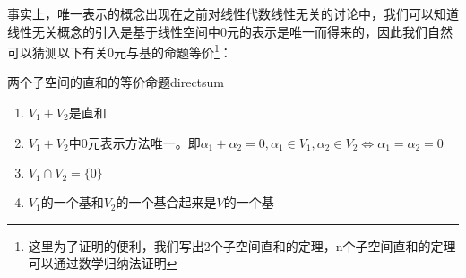     事实上，唯一表示的概念出现在之前对线性代数线性无关的讨论中，我们可以知道线性无关概念的引入是基于线性空间中0元的表示是唯一而得来的，因此我们自然可以猜测以下有关0元与基的命题等价\footnote{这里为了证明的便利，我们写出2个子空间直和的定理，n个子空间直和的定理可以通过数学归纳法证明}：
    \begin{theorem}{两个子空间的直和的等价命题}{directsum}
        \begin{enumerate}
            \item $V_1+V_2$是直和
            \item $V_1+V_2$中0元表示方法唯一。即$\alpha_1+\alpha_2=0,\alpha_1\in V_1,\alpha_2\in V_2\Longleftrightarrow\alpha_1=\alpha_2=0$
            \item $V_1\cap V_2=\{0\}$
            \item $V_1$的一个基和$V_2$的一个基合起来是$V$的一个基
        \end{enumerate}
    \end{theorem}
